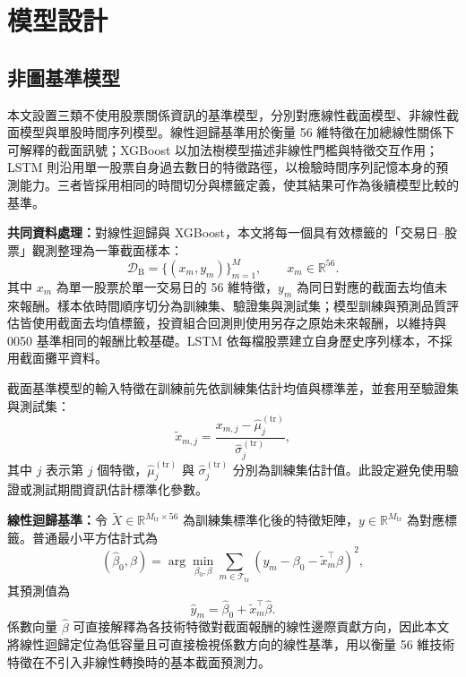 \section{模型設計}
\label{sec:models}

\subsection{非圖基準模型}
\label{subsec:baseline_models}

本文設置三類不使用股票關係資訊的基準模型，分別對應線性截面模型、非線性截面模型與單股時間序列模型。線性迴歸基準用於衡量 56 維特徵在加總線性關係下可解釋的截面訊號；XGBoost 以加法樹模型描述非線性門檻與特徵交互作用；LSTM 則沿用單一股票自身過去數日的特徵路徑，以檢驗時間序列記憶本身的預測能力。三者皆採用相同的時間切分與標籤定義，使其結果可作為後續模型比較的基準。

\textbf{共同資料處理：}對線性迴歸與 XGBoost，本文將每一個具有效標籤的「交易日--股票」觀測整理為一筆截面樣本：
\begin{equation}
\mathcal{D}_{\mathrm{B}}=\{(x_m,y_m)\}_{m=1}^{M}, \qquad x_m\in\mathbb{R}^{56}.
\end{equation}
其中 \(x_m\) 為單一股票於單一交易日的 56 維特徵，\(y_m\) 為同日對應的截面去均值未來報酬。樣本依時間順序切分為訓練集、驗證集與測試集；模型訓練與預測品質評估皆使用截面去均值標籤，投資組合回測則使用另存之原始未來報酬，以維持與 0050 基準相同的報酬比較基礎。LSTM 依每檔股票建立自身歷史序列樣本，不採用截面攤平資料。

截面基準模型的輸入特徵在訓練前先依訓練集估計均值與標準差，並套用至驗證集與測試集：
\begin{equation}
\widetilde{x}_{m,j}
=\frac{x_{m,j}-\widehat{\mu}^{(\mathrm{tr})}_{j}}
{\widehat{\sigma}^{(\mathrm{tr})}_{j}},
\end{equation}
其中 \(j\) 表示第 \(j\) 個特徵，\(\widehat{\mu}^{(\mathrm{tr})}_{j}\) 與 \(\widehat{\sigma}^{(\mathrm{tr})}_{j}\) 分別為訓練集估計值。此設定避免使用驗證或測試期間資訊估計標準化參數。

\textbf{線性迴歸基準：}令 \(\widetilde{X}\in\mathbb{R}^{M_{\mathrm{tr}}\times 56}\) 為訓練集標準化後的特徵矩陣，\(y\in\mathbb{R}^{M_{\mathrm{tr}}}\) 為對應標籤。普通最小平方估計式為
\begin{equation}
(\widehat{\beta}_0,\widehat{\beta})
=\arg\min_{\beta_0,\beta}
\sum_{m\in\mathcal{T}_{\mathrm{tr}}}
\left(y_m-\beta_0-\widetilde{x}_m^{\top}\beta\right)^2 ,
\end{equation}
其預測值為
\begin{equation}
\widehat{y}_m=\widehat{\beta}_0+\widetilde{x}_m^{\top}\widehat{\beta}.
\end{equation}
係數向量 \(\widehat{\beta}\) 可直接解釋為各技術特徵對截面報酬的線性邊際貢獻方向，因此本文將線性迴歸定位為低容量且可直接檢視係數方向的線性基準，用以衡量 56 維技術特徵在不引入非線性轉換時的基本截面預測力。


